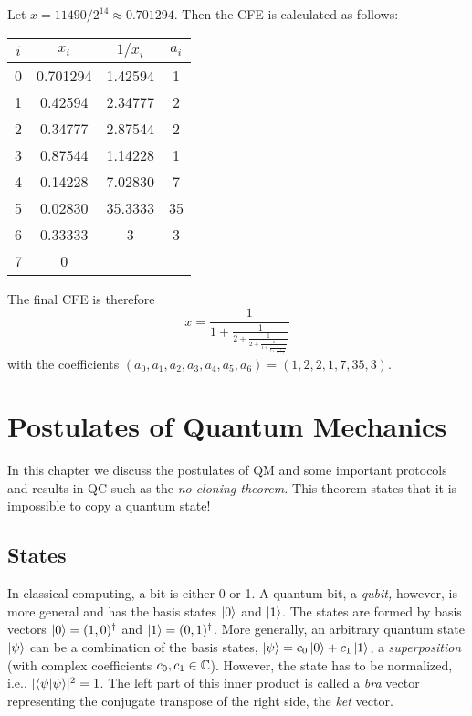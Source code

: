 		\begin{example}
			Let \( x = \num{11490} / 2^{14} \approx 0.701294 \). Then the \ac{CFE} is calculated as follows:
			\begin{center}
				\begin{tabular}{c|ccc}
					\toprule
					\(i\)   & \(x_i\)        & \(1 / x_i\)   & \(a_i\)  \\ \midrule
					\num{0} & \num{0.701294} & \num{1.42594} & \num{1}  \\ \bottomrule
					\num{1} & \num{0.42594}  & \num{2.34777} & \num{2}  \\ \bottomrule
					\num{2} & \num{0.34777}  & \num{2.87544} & \num{2}  \\ \bottomrule
					\num{3} & \num{0.87544}  & \num{1.14228} & \num{1}  \\ \bottomrule
					\num{4} & \num{0.14228}  & \num{7.02830} & \num{7}  \\ \bottomrule
					\num{5} & \num{0.02830}  & \num{35.3333} & \num{35} \\ \bottomrule
					\num{6} & \num{0.33333}  & \num{3}       & \num{3}  \\ \bottomrule
					\num{7} & \num{0}        &               &          \\ \bottomrule
				\end{tabular}
			\end{center}
			The final \ac{CFE} is therefore
			\begin{equation}
				x = \frac{1}{1 + \frac{1}{2 + \frac{1}{2 + \frac{1}{1 + \frac{1}{7 + \frac{1}{35 + \frac{1}{3}}}}}}}
			\end{equation}
			with the coefficients \( (a_0, a_1, a_2, a_3, a_4, a_5, a_6) = (1, 2, 2, 1, 7, 35, 3) \).
		\end{example}

\chapter{Postulates of Quantum Mechanics}
	In this chapter we discuss the postulates of \ac{QM} and some important protocols and results in \ac{QC} such as the \emph{no-cloning theorem.} This theorem states that it is impossible to copy a quantum state!

	\section{States}
		In classical computing, a bit is either \num{0} or \num{1}. A quantum bit, a \emph{qubit,} however, is more general and has the basis states \(\ket{0}\) and \(\ket{1}\). The states are formed by basis vectors \( \ket{0} = (1, 0)^\dagger \) and \( \ket{1} = (0, 1)^\dagger \). More generally, an arbitrary quantum state \(\ket{\psi}\) can be a combination of the basis states, \( \ket{\psi} = c_0 \ket{0} + c_1 \ket{1} \), a \emph{superposition} (with complex coefficients \( c_0, c_1 \in \mathbb{C} \)). However, the state has to be normalized, i.e., \( \lvert \braket{\psi}{\psi} \rvert^2 = 1 \). The left part of this inner product is called a \emph{bra} vector representing the conjugate transpose of the right side, the \emph{ket} vector.

